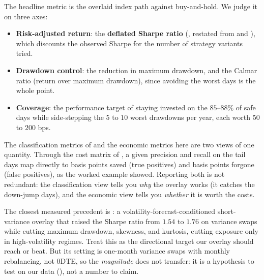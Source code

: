 The headline metric is the overlaid index path against buy-and-hold. We judge it on three axes:
\begin{itemize}
  \item \textbf{Risk-adjusted return}: the \textbf{deflated Sharpe ratio} (, restated from  and ), which discounts the observed Sharpe for the number of strategy variants tried.
  \item \textbf{Drawdown control}: the reduction in maximum drawdown, and the Calmar ratio (return over maximum drawdown), since avoiding the worst days is the whole point.
  \item \textbf{Coverage}: the performance target of staying invested on the $85$--$88\%$ of safe days while side-stepping the $5$ to $10$ worst drawdowns per year, each worth $50$ to $200$ bps.
\end{itemize}

\begin{keyidea}
The classification metrics of  and the economic metrics here are two views of one quantity. Through the cost matrix of , a given precision and recall on the tail days map directly to basis points saved (true positives) and basis points forgone (false positives), as the worked example showed. Reporting both is not redundant: the classification view tells you \emph{why} the overlay works (it catches the down-jump days), and the economic view tells you \emph{whether} it is worth the costs.
\end{keyidea}

\begin{application}
The closest measured precedent is \citet{Yang2024}: a volatility-forecast-conditioned short-variance overlay that raised the Sharpe ratio from $1.54$ to $1.76$ on variance swaps while cutting maximum drawdown, skewness, and kurtosis, cutting exposure only in high-volatility regimes. Treat this as the directional target our overlay should reach or beat. But its setting is one-month variance swaps with monthly rebalancing, not 0DTE, so the \emph{magnitude} does not transfer: it is a hypothesis to test on our data (), not a number to claim.
\end{application}

